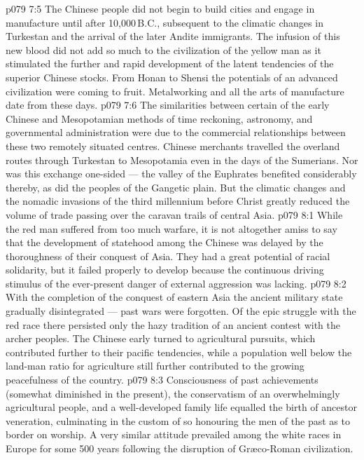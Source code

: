 \vs p079 7:5 The Chinese people did not begin to build cities and engage in manufacture until after 10,000\,B.C., subsequent to the climatic changes in Turkestan and the arrival of the later Andite immigrants. The infusion of this new blood did not add so much to the civilization of the yellow man as it stimulated the further and rapid development of the latent tendencies of the superior Chinese stocks. From Honan to Shensi the potentials of an advanced civilization were coming to fruit. Metalworking and all the arts of manufacture date from these days.
\vs p079 7:6 The similarities between certain of the early Chinese and Mesopotamian methods of time reckoning, astronomy, and governmental administration were due to the commercial relationships between these two remotely situated centres. Chinese merchants travelled the overland routes through Turkestan to Mesopotamia even in the days of the Sumerians. Nor was this exchange one\hyp{}sided --- the valley of the Euphrates benefited considerably thereby, as did the peoples of the Gangetic plain. But the climatic changes and the nomadic invasions of the third millennium before Christ greatly reduced the volume of trade passing over the caravan trails of central Asia.
\vs p079 8:1 While the red man suffered from too much warfare, it is not altogether amiss to say that the development of statehood among the Chinese was delayed by the thoroughness of their conquest of Asia. They had a great potential of racial solidarity, but it failed properly to develop because the continuous driving stimulus of the ever\hyp{}present danger of external aggression was lacking.
\vs p079 8:2 With the completion of the conquest of eastern Asia the ancient military state gradually disintegrated --- past wars were forgotten. Of the epic struggle with the red race there persisted only the hazy tradition of an ancient contest with the archer peoples. The Chinese early turned to agricultural pursuits, which contributed further to their pacific tendencies, while a population well below the land\hyp{}man ratio for agriculture still further contributed to the growing peacefulness of the country.
\vs p079 8:3 Consciousness of past achievements (somewhat diminished in the present), the conservatism of an overwhelmingly agricultural people, and a well\hyp{}developed family life equalled the birth of ancestor veneration, culminating in the custom of so honouring the men of the past as to border on worship. A very similar attitude prevailed among the white races in Europe for some 500 years following the disruption of Gr\ae co\hyp{}Roman civilization.

